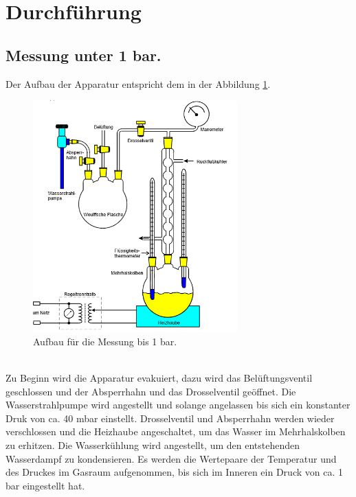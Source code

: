 \section{Durchführung}
\label{sec:Durchführung}
\subsection{Messung unter  1 bar.}
Der Aufbau der Apparatur entspricht dem in der Abbildung \ref{fig:aufbau1}.
\begin{figure}
  \centering
  \includegraphics[width=0.7\textwidth]{aufbau1.PNG}
  \caption{Aufbau für die Messung bis 1 bar.}
  \label{fig:aufbau1}
\end{figure}\\
Zu Beginn wird die Apparatur evakuiert, dazu wird das
Belüftungsventil geschlossen und der Absperrhahn und das
Drosselventil geöffnet. Die Wasserstrahlpumpe wird angestellt
und solange angelassen bis sich ein konstanter Druk von ca. 40 mbar einstellt.
Drosselventil und Absperrhahn werden wieder verschlossen und die Heizhaube angeschaltet, um das Wasser im Mehrhalskolben zu erhitzen.
Die Wasserkühlung wird angestellt, um den entstehenden Wasserdampf zu kondensieren.
Es werden die Wertepaare der Temperatur und des Druckes im Gasraum aufgenommen,
bis sich im Inneren ein Druck von ca. 1 bar eingestellt hat.
\newpage

